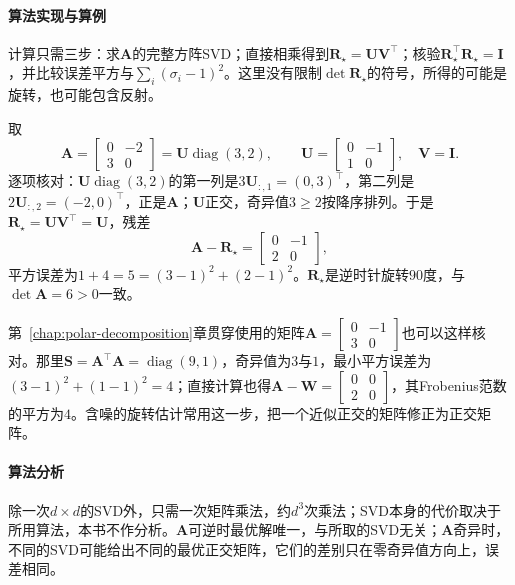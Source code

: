 \paragraph{算法实现与算例}

计算只需三步：求$\bm A$的完整方阵SVD；直接相乘得到$\bm R_\star=\bm U\bm V^\top$；核验$\bm R_\star^\top\bm R_\star=\bm I$，并比较误差平方与$\sum_i(\sigma_i-1)^2$。这里没有限制$\det\bm R_\star$的符号，所得的可能是旋转，也可能包含反射。

\begin{example}[二阶正交逼近]
\label{ex:matrix-approximation-orthogonal-two-by-two}
取
\[
 \bm A=\begin{bmatrix}0&-2\\3&0\end{bmatrix}
 =\bm U\operatorname{diag}(3,2),\qquad
 \bm U=\begin{bmatrix}0&-1\\1&0\end{bmatrix},\quad\bm V=\bm I .
\]
逐项核对：$\bm U\operatorname{diag}(3,2)$的第一列是$3\bm U_{:,1}=(0,3)^\top$，第二列是$2\bm U_{:,2}=(-2,0)^\top$，正是$\bm A$；$\bm U$正交，奇异值$3\geq2$按降序排列。于是$\bm R_\star=\bm U\bm V^\top=\bm U$，残差
\[
 \bm A-\bm R_\star=\begin{bmatrix}0&-1\\2&0\end{bmatrix},
\]
平方误差为$1+4=5=(3-1)^2+(2-1)^2$。$\bm R_\star$是逆时针旋转$90$度，与$\det\bm A=6>0$一致。
\end{example}

第~\ref{chap:polar-decomposition}章贯穿使用的矩阵$\bm A=\left[\begin{smallmatrix}0&-1\\3&0\end{smallmatrix}\right]$也可以这样核对。那里$\bm S=\bm A^\top\bm A=\operatorname{diag}(9,1)$，奇异值为$3$与$1$，最小平方误差为$(3-1)^2+(1-1)^2=4$；直接计算也得$\bm A-\bm W=\left[\begin{smallmatrix}0&0\\2&0\end{smallmatrix}\right]$，其Frobenius范数的平方为$4$。含噪的旋转估计常用这一步，把一个近似正交的矩阵修正为正交矩阵。

\paragraph{算法分析}

除一次$d\times d$的SVD外，只需一次矩阵乘法，约$d^3$次乘法；SVD本身的代价取决于所用算法，本书不作分析。$\bm A$可逆时最优解唯一，与所取的SVD无关；$\bm A$奇异时，不同的SVD可能给出不同的最优正交矩阵，它们的差别只在零奇异值方向上，误差相同。

